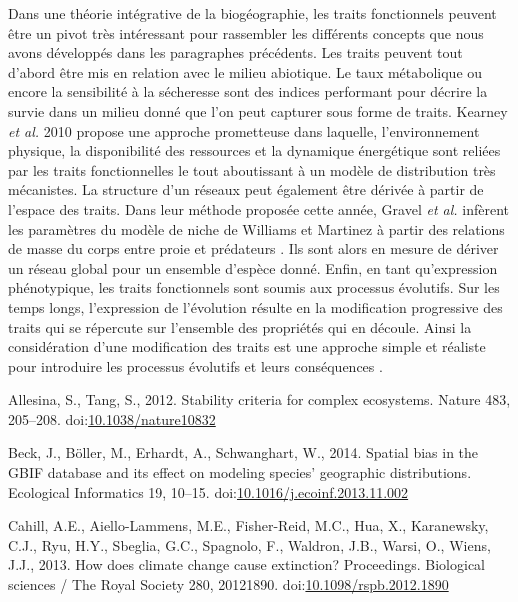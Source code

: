Dans une théorie intégrative de la biogéographie, les traits
fonctionnels peuvent être un pivot très intéressant pour rassembler les
différents concepts que nous avons développés dans les paragraphes
précédents. Les traits peuvent tout d'abord être mis en relation avec le
milieu abiotique. Le taux métabolique ou encore la sensibilité à la
sécheresse sont des indices performant pour décrire la survie dans un
milieu donné \cite{Kearney2004,Engelbrecht2007} que l'on peut capturer
sous forme de traits. Kearney \textit{et al.} 2010 propose une approche
prometteuse dans laquelle, l'environnement physique, la disponibilité
des ressources et la dynamique énergétique sont reliées par les traits
fonctionnelles le tout aboutissant à un modèle de distribution très
mécanistes. La structure d'un réseaux peut également être dérivée à
partir de l'espace des traits. Dans leur méthode proposée cette année,
Gravel \textit{et al.} infèrent les paramètres du modèle de niche de
Williams et Martinez \cite{Williams2000} à partir des relations de masse
du corps entre proie et prédateurs \cite{Gravel2013}. Ils sont alors en
mesure de dériver un réseau global pour un ensemble d'espèce donné.
Enfin, en tant qu'expression phénotypique, les traits fonctionnels sont
soumis aux processus évolutifs. Sur les temps longs, l'expression de
l'évolution résulte en la modification progressive des traits qui se
répercute sur l'ensemble des propriétés qui en découle. Ainsi la
considération d'une modification des traits est une approche simple et
réaliste pour introduire les processus évolutifs et leurs conséquences
\cite{Guill2008,Loeuille2005}.

\hypertarget{refs}{}
\hypertarget{ref-Allesina2012a}{}
Allesina, S., Tang, S., 2012. Stability criteria for complex ecosystems.
Nature 483, 205--208.
doi:\href{https://doi.org/10.1038/nature10832}{10.1038/nature10832}

\hypertarget{ref-Beck2014a}{}
Beck, J., Böller, M., Erhardt, A., Schwanghart, W., 2014. Spatial bias
in the GBIF database and its effect on modeling species' geographic
distributions. Ecological Informatics 19, 10--15.
doi:\href{https://doi.org/10.1016/j.ecoinf.2013.11.002}{10.1016/j.ecoinf.2013.11.002}

\hypertarget{ref-Cahill2013}{}
Cahill, A.E., Aiello-Lammens, M.E., Fisher-Reid, M.C., Hua, X.,
Karanewsky, C.J., Ryu, H.Y., Sbeglia, G.C., Spagnolo, F., Waldron, J.B.,
Warsi, O., Wiens, J.J., 2013. How does climate change cause extinction?
Proceedings. Biological sciences / The Royal Society 280, 20121890.
doi:\href{https://doi.org/10.1098/rspb.2012.1890}{10.1098/rspb.2012.1890}


